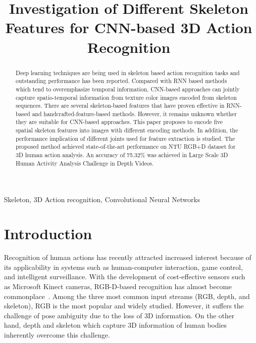 \documentclass[5pt]{article}
\begin{document}
\sloppy

\def\x{{\mathbf x}}
\def\L{{\cal L}}


\title{Investigation of Different Skeleton Features for CNN-based 3D Action Recognition}
\address{Advanced Multimedia Research Lab, University of Wollongong, Australia \\
	\{zd027, pw212, philipo, wanqing\}@uow.edu.au}


\maketitle


\begin{abstract}
Deep learning techniques are being used in skeleton based action 
recognition tasks and outstanding performance has been reported. Compared with 
RNN based methods which tend to overemphasize temporal information, CNN-based 
approaches can jointly capture spatio-temporal information from texture color 
images encoded from skeleton sequences. There are several skeleton-based 
features that have proven effective in RNN-based and handcrafted-feature-based 
methods. However, it remains unknown whether they are suitable for CNN-based 
approaches. This paper proposes to encode five spatial skeleton features into 
images with different encoding methods. In addition, the performance 
implication of different joints used for feature extraction is studied. The 
proposed method achieved state-of-the-art performance on NTU RGB+D dataset for 
3D human action analysis. An accuracy of 75.32\% was achieved in Large Scale 3D 
Human Activity Analysis Challenge in Depth Videos.
\end{abstract}
\begin{keywords}
Skeleton, 3D Action recognition, Convolutional Neural Networks
\end{keywords}
\section{Introduction}
\label{sec:intro}
Recognition of human actions has recently attracted increased interest because 
of its applicability in systems such as human-computer interaction, game 
control, and intelligent surveillance. With the development of cost-effective 
sensors such as Microsoft Kinect cameras, RGB-D-based recognition has 
almost become 
commonplace~\cite{li2010action,Wang2015,pichaoTHMS,Pichaocvpr2017}. Among the 
three most common input streams (RGB, depth, and skeleton),  RGB is the most 
popular and widely studied. However, it suffers the challenge of 
pose ambiguity due to the loss of 3D information. On the other hand, depth and 
skeleton which capture 3D information of human bodies inherently overcome 
this challenge. 
	
\end{document}
